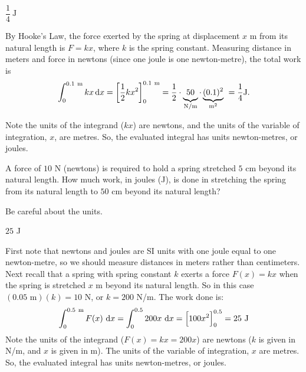\begin{answer}
$\dfrac{1}{4}\ \mathrm{J}$
\end{answer}

\begin{solution}
By Hooke's Law, the force exerted by the spring
at displacement $x$ m from its natural length is $F = kx$,
where $k$ is the spring constant.
Measuring distance in meters and force in newtons (since one joule is one newton-metre), the total work is
\begin{align*}
\int_{0}^{0.1\ \mathrm{m}} kx \,\dee{x} = \bigg[\frac{1}{2}kx^2\bigg]_{0}^{0.1\ \mathrm{m}}
 = \frac{1}{2}\cdot\underbrace{ \vphantom{(}50}_{\mathrm{N/m}}\cdot\underbrace{ (0.1)^2}_{\mathrm{m}^2}\ =\frac{1}{4}\mathrm{J}.
\end{align*}

Note the units of the integrand ($ kx$) are newtons, and the units of the variable of integration, $x$, are metres. So, the evaluated integral has units newton-metres, or joules.


\end{solution}


\begin{Mquestion}[2013A]
A force of $10$ N (newtons) is required to hold
a spring stretched $5$ cm beyond its natural length. How much work,
in joules (J), is done in stretching the spring from its
natural length to $50$ cm beyond its natural length?
\end{Mquestion}

\begin{hint}
Be careful about the units.
\end{hint}

\begin{answer}
$25$ J
\end{answer}

\begin{solution}
First note that newtons and joules are SI units with one joule equal to one newton-metre, so we should
measure distances in meters rather than centimeters.
Next recall that a spring with spring constant $k$
exerts a force $F(x)=kx$ when the spring is stretched  $x$ m beyond its
natural length. So in this case $(0.05\text{ m})( k) =10 \text{ N}$, or $k=200$ N/m. The work done is:
\begin{align*}
\int_0^{0.5\ \mathrm{m}} F(x)\ \mathrm{d}x
=\int_0^{0.5} 200 x\ \mathrm{d}x
=\Big[100 x^2\Big]_0^{0.5}
=25\ \mathrm{J}
\end{align*}
Note the units of the integrand ($F(x) = kx=200x$) are newtons ($k$ is given in N/m, and $x$ is given in m). The units of the variable of integration, $x$ are metres. So, the evaluated integral has units newton-metres, or joules.
\end{solution}

